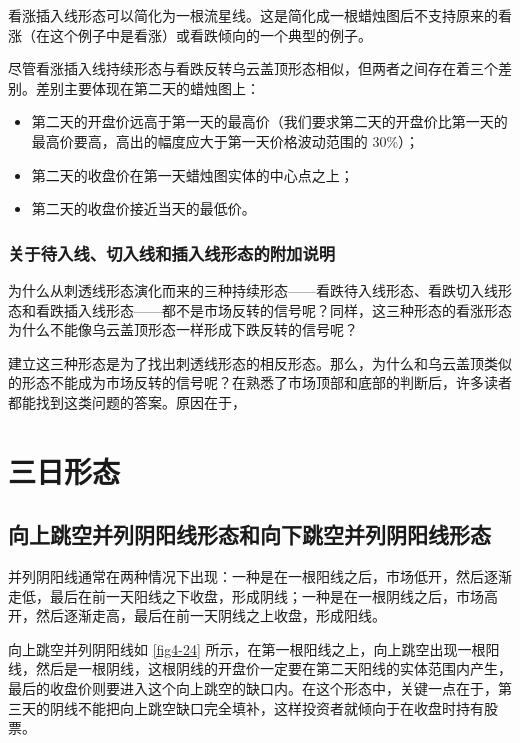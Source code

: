看涨插入线形态可以简化为一根流星线。这是简化成一根蜡烛图后不支持原来的看涨（在这个例子中是看涨）或看跌倾向的一个典型的例子。

尽管看涨插入线持续形态与看跌反转乌云盖顶形态相似，但两者之间存在着三个差别。差别主要体现在第二天的蜡烛图上：
\begin{itemize}
    \item 第二天的开盘价远高于第一天的最高价（我们要求第二天的开盘价比第一天的最高价要高，高出的幅度应大于第一天价格波动范围的 30\%）；
    \item 第二天的收盘价在第一天蜡烛图实体的中心点之上；
    \item 第二天的收盘价接近当天的最低价。
\end{itemize}
\subsubsection*{关于待入线、切入线和插入线形态的附加说明}
为什么从刺透线形态演化而来的三种持续形态——看跌待入线形态、看跌切入线形态和看跌插入线形态——都不是市场反转的信号呢？同样，这三种形态的看涨形态为什么不能像乌云盖顶形态一样形成下跌反转的信号呢？

建立这三种形态是为了找出刺透线形态的相反形态。那么，为什么和乌云盖顶类似的形态不能成为市场反转的信号呢？在熟悉了市场顶部和底部的判断后，许多读者都能找到这类问题的答案。原因在于，
\section{三日形态}
\subsection{向上跳空并列阴阳线形态和向下跳空并列阴阳线形态}
并列阴阳线通常在两种情况下出现：一种是在一根阳线之后，市场低开，然后逐渐走低，最后在前一天阳线之下收盘，形成阴线；一种是在一根阴线之后，市场高开，然后逐渐走高，最后在前一天阴线之上收盘，形成阳线。

向上跳空并列阴阳线如 \autoref{fig4-24} 所示，在第一根阳线之上，向上跳空出现一根阳线，然后是一根阴线，这根阴线的开盘价一定要在第二天阳线的实体范围内产生，最后的收盘价则要进入这个向上跳空的缺口内。在这个形态中，关键一点在于，第三天的阴线不能把向上跳空缺口完全填补，这样投资者就倾向于在收盘时持有股票。

